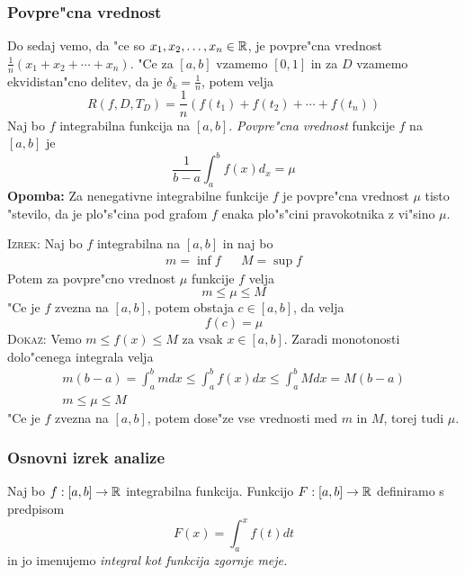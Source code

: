 \subsubsection{Povpre"cna vrednost}
Do sedaj vemo, da "ce so $x_1, x_2, \ldots, x_n \in \mathbb{R}$, je povpre"cna vrednost $\frac{1}{n} (x_1 + x_2 + \cdots + x_n)$. "Ce za $[a, b]$ vzamemo $[0, 1]$ in za $D$ vzamemo ekvidistan"cno delitev, da je $\delta_k  = \frac{1}{n}$, potem velja
\begin{equation*}
R(f, D, T_D) = \frac{1}{n} (f(t_1) + f(t_2) + \cdots + f(t_n))
\end{equation*}
%
 Naj bo $f$ integrabilna funkcija na $[a, b]$. \emph{Povpre"cna vrednost} funkcije $f$ na $[a, b]$ je
\begin{equation*}
\dfrac{1}{b - a} \int_{a}^{b} f(x) d_x = \mu
\end{equation*}
\textbf{Opomba:} Za nenegativne integrabilne funkcije $f$ je povpre"cna vrednost $\mu$ tisto "stevilo, da je plo"s"cina pod grafom $f$ enaka plo"s"cini pravokotnika z vi"sino $\mu$.

\textsc{Izrek:} Naj bo $f$ integrabilna na $[a, b]$ in naj bo
\begin{align*}
m = \inf f && M = \sup f
\end{align*}
Potem za povpre"cno vrednost $\mu$ funkcije $f$ velja
\begin{equation*}
m \leq \mu \leq M
\end{equation*}
"Ce je $f$ zvezna na $[a, b]$, potem obstaja $c \in [a, b]$, da velja
\begin{equation*}
f(c) = \mu
\end{equation*}
\textsc{Dokaz:} Vemo $m \leq f(x) \leq M$ za vsak $x \in [a, b]$. Zaradi monotonosti dolo"cenega integrala velja
\begin{gather*}
m(b-a) = \int_a^b m dx \leq \int_a^b f(x) dx \leq \int_a^b M dx = M(b-a) \\
m \leq \mu \leq M
\end{gather*}
"Ce je $f$ zvezna na $[a, b]$, potem dose"ze vse vrednosti med $m$ in $M$, torej tudi $\mu$.
%
\subsubsection{Osnovni izrek analize}
 Naj bo $f: [a, b] \to \mathbb{R}$ integrabilna funkcija. Funkcijo $F: [a, b] \to \mathbb{R}$ definiramo s predpisom
\begin{equation*}
F(x) = \int_a^x f(t) dt
\end{equation*}
in jo imenujemo \emph{integral kot funkcija zgornje meje.}

